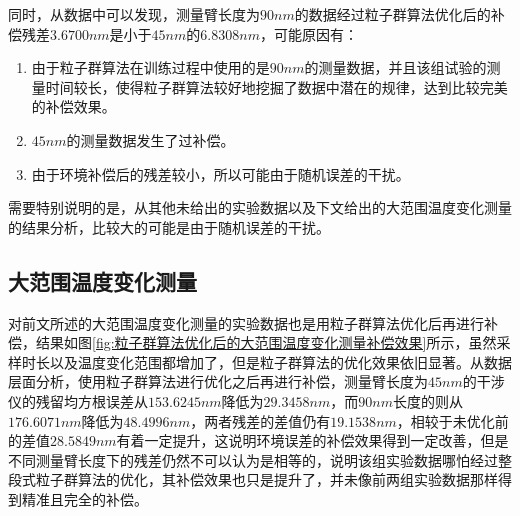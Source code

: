 同时，从数据中可以发现，测量臂长度为$90nm$的数据经过粒子群算法优化后的补偿残差$3.6700nm$是小于$45nm$的$6.8308nm$，可能原因有：
\begin{enumerate}
  \item 由于粒子群算法在训练过程中使用的是$90nm$的测量数据，并且该组试验的测量时间较长，使得粒子群算法较好地挖掘了数据中潜在的规律，达到比较完美的补偿效果。
  \item $45nm$的测量数据发生了过补偿。
  \item 由于环境补偿后的残差较小，所以可能由于随机误差的干扰。
\end{enumerate}

需要特别说明的是，从其他未给出的实验数据以及下文给出的大范围温度变化测量的结果分析，比较大的可能是由于随机误差的干扰。
\subsection{大范围温度变化测量}
对前文所述的大范围温度变化测量的实验数据也是用粒子群算法优化后再进行补偿，结果如图\ref{fig:粒子群算法优化后的大范围温度变化测量补偿效果}所示，虽然采样时长以及温度变化范围都增加了，但是粒子群算法的优化效果依旧显著。从数据层面分析，使用粒子群算法进行优化之后再进行补偿，测量臂长度为$45nm$的干涉仪的残留均方根误差从$153.6245nm$降低为$29.3458 nm$，而$90nm$长度的则从$176.6071nm$降低为$48.4996nm$，两者残差的差值仍有$19.1538nm$，相较于未优化前的差值$28.5849nm$有着一定提升，这说明环境误差的补偿效果得到一定改善，但是不同测量臂长度下的残差仍然不可以认为是相等的，说明该组实验数据哪怕经过整段式粒子群算法的优化，其补偿效果也只是提升了，并未像前两组实验数据那样得到精准且完全的补偿。
